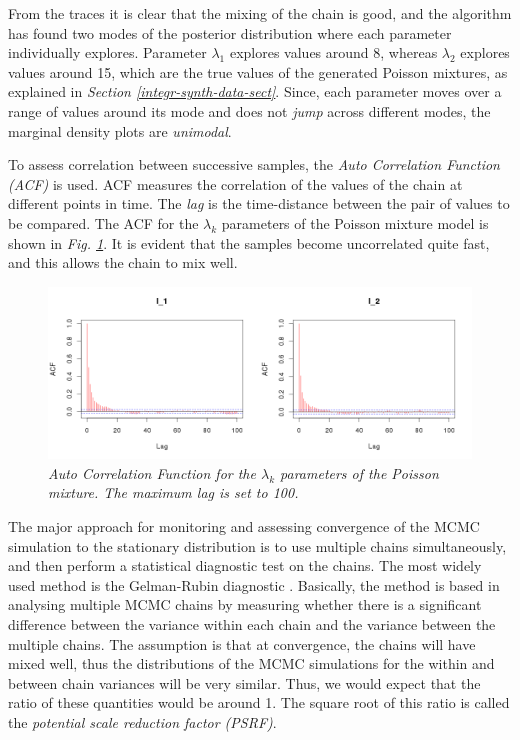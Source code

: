 From the traces it is clear that the mixing of the chain is good, and the algorithm has found two modes of the posterior distribution where each parameter individually explores. Parameter $\lambda_{1}$ explores values around 8, whereas $\lambda_{2}$ explores values around 15, which are the true values of the generated Poisson mixtures, as explained in \emph{Section \ref{integr-synth-data-sect}}. Since, each parameter moves over a range of values around its mode and does not \emph{jump} across different modes, the marginal density plots are \emph{unimodal}.

To assess correlation between successive samples, the \emph{Auto Correlation Function (ACF)} is used. ACF measures the correlation of the values of the chain at different points in time. The \emph{lag} is the time-distance between the pair of values to be compared. The ACF for the $\lambda_{k}$ parameters of the Poisson mixture model is shown in \emph{Fig. \ref{acfL-pic}}. It is evident that the samples become uncorrelated quite fast, and this allows the chain to mix well.
\begin{figure}[!ht]
\begin{center}
 \includegraphics[scale = 0.40]{images/acfL.png}
\caption{\emph{Auto Correlation Function for the $\lambda_{k}$ parameters of the Poisson mixture. The maximum lag is set to 100.}}
\label{acfL-pic}
\end{center}
\end{figure}

The major approach for monitoring and assessing convergence of the MCMC simulation to the stationary distribution is to use multiple chains simultaneously, and then perform a statistical diagnostic test on the chains. The most widely used method is the Gelman-Rubin diagnostic \citep{Gelman1992, Brooks1997}. Basically, the method is based in analysing multiple MCMC chains by measuring whether there is a significant difference between the variance within each chain and the variance between the multiple chains. The assumption is that at convergence, the chains will have mixed well, thus the distributions of the MCMC simulations for the within and between chain variances will be very similar. Thus, we would expect that the ratio of these quantities would be around 1. The square root of this ratio is called the \emph{potential scale reduction factor (PSRF)}. 

